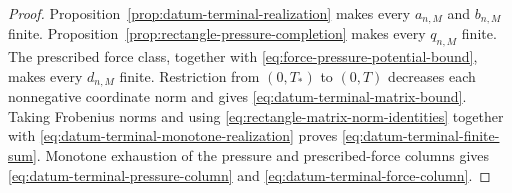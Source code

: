 \begin{proof}
Proposition~\ref{prop:datum-terminal-realization} makes every
\(a_{n,M}\) and \(b_{n,M}\) finite.
Proposition~\ref{prop:rectangle-pressure-completion} makes every
\(q_{n,M}\) finite.  The prescribed force class, together with
\eqref{eq:force-pressure-potential-bound}, makes every \(d_{n,M}\) finite.
Restriction from \((0,T_*)\) to \((0,T)\) decreases each nonnegative
coordinate norm and gives
\eqref{eq:datum-terminal-matrix-bound}.  Taking Frobenius norms and using
\eqref{eq:rectangle-matrix-norm-identities} together with
\eqref{eq:datum-terminal-monotone-realization} proves
\eqref{eq:datum-terminal-finite-sum}.  Monotone exhaustion of the pressure
and prescribed-force columns gives
\eqref{eq:datum-terminal-pressure-column} and
\eqref{eq:datum-terminal-force-column}.
\end{proof}
